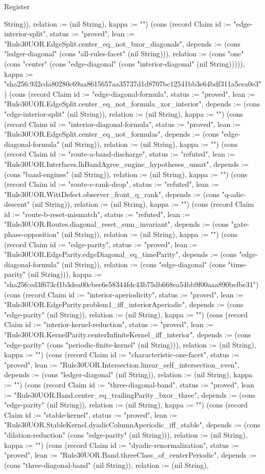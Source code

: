 \begin{lexlean}{Register}
\begin{semanticmodule}
{String)), relation := (nil String), kappa := ""}) (cons (record Claim {id := "edge-interior-split", status := "proved", lean := "Rule30UOR.EdgeSplit.center_eq_not_bxor_diagonals", depends := (cons "ledger-diagonal" (cons "all-rules-facet" (nil String))), relation := (cons "one" (cons "center" (cons "edge-diagonal" (cons "interior-diagonal" (nil String))))), kappa := "sha256:932cda80280c69aa8615657aa35737d1d8707bc12541bb3e64bdf311a5cea0e3"}) (cons (record Claim {id := "edge-diagonal-formula", status := "proved", lean := "Rule30UOR.EdgeSplit.center_eq_not_formula_xor_interior", depends := (cons "edge-interior-split" (nil String)), relation := (nil String), kappa := ""}) (cons (record Claim {id := "interior-diagonal-formula", status := "proved", lean := "Rule30UOR.EdgeSplit.center_eq_not_formulas", depends := (cons "edge-diagonal-formula" (nil String)), relation := (nil String), kappa := ""}) (cons (record Claim {id := "route-a-band-discharge", status := "refuted", lean := "Rule30UOR.Interfaces.lhBandAgree_engine_hypotheses_unsat", depends := (cons "band-engines" (nil String)), relation := (nil String), kappa := ""}) (cons (record Claim {id := "route-c-rank-drop", status := "refuted", lean := "Rule30UOR.WittDefect.observer_front_q_rank", depends := (cons "q-adic-descent" (nil String)), relation := (nil String), kappa := ""}) (cons (record Claim {id := "route-b-reset-mismatch", status := "refuted", lean := "Rule30UOR.Routes.diagonal_reset_sum_invariant", depends := (cons "gate-phase-opposition" (nil String)), relation := (nil String), kappa := ""}) (cons (record Claim {id := "edge-parity", status := "proved", lean := "Rule30UOR.EdgeParity.edgeDiagonal_eq_timeParity", depends := (cons "edge-diagonal-formula" (nil String)), relation := (cons "edge-diagonal" (cons "time-parity" (nil String))), kappa := "sha256:ed3f673cf1b3dea00cbee6e58344fdc43b75db668ea54bb9f00aaa890befbe31"}) (cons (record Claim {id := "interior-aperiodicity", status := "proved", lean := "Rule30UOR.EdgeParity.problem1_iff_interiorAperiodic", depends := (cons "edge-parity" (nil String)), relation := (nil String), kappa := ""}) (cons (record Claim {id := "interior-kernel-reduction", status := "proved", lean := "Rule30UOR.KernelParity.centerInfiniteKernel_iff_interior", depends := (cons "edge-parity" (cons "periodic-finite-kernel" (nil String))), relation := (nil String), kappa := ""}) (cons (record Claim {id := "characteristic-one-facet", status := "proved", lean := "Rule30UOR.Intersection.linear_self_intersection_even", depends := (cons "ledger-diagonal" (nil String)), relation := (nil String), kappa := ""}) (cons (record Claim {id := "three-diagonal-band", status := "proved", lean := "Rule30UOR.Band.center_eq_trailingParity_bxor_three", depends := (cons "edge-parity" (nil String)), relation := (nil String), kappa := ""}) (cons (record Claim {id := "stable-kernel", status := "proved", lean := "Rule30UOR.StableKernel.dyadicColumnAperiodic_iff_stable", depends := (cons "dilation-reduction" (cons "edge-parity" (nil String))), relation := (nil String), kappa := ""}) (cons (record Claim {id := "dyadic-renormalization", status := "proved", lean := "Rule30UOR.Band.threeClass_of_centerPeriodic", depends := (cons "three-diagonal-band" (nil String)), relation := (nil String), }
\end{semanticmodule}
\end{lexlean}
